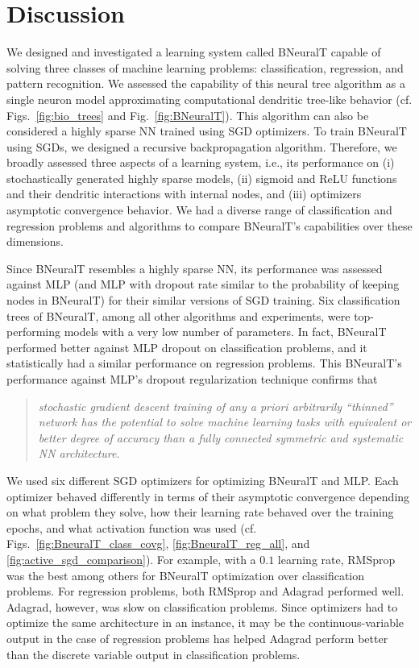 \documentclass[11pt,a4paper]{article}
\begin{document}
    
    \section{Discussion} 
    \label{sec:discussion}   
We designed and investigated a learning system called BNeuralT capable of solving three classes of machine learning problems: classification, regression, and pattern recognition. We assessed the capability of this neural tree algorithm as a single neuron model approximating computational dendritic tree-like behavior (cf. Figs.~\ref{fig:bio_trees} and Fig.~\ref{fig:BNeuralT}). This algorithm can also be considered a highly sparse NN trained using SGD optimizers. To train BNeuralT using SGDs, we designed a recursive backpropagation algorithm. Therefore, we broadly assessed three aspects of a learning system, i.e., its performance on (i) stochastically generated highly sparse models, (ii) sigmoid and ReLU functions and their dendritic interactions with internal nodes, and (iii) optimizers asymptotic convergence behavior. We had a diverse range of classification and regression problems and algorithms to compare BNeuralT's capabilities over these dimensions. 
    
    Since BNeuralT resembles a highly sparse NN, its performance was assessed against MLP (and MLP with dropout rate similar to the  probability of keeping nodes in BNeuralT) for their similar versions of SGD training. Six classification trees of BNeuralT, among all other algorithms and experiments, were top-performing models with a very low number of parameters. In fact, BNeuralT performed better against MLP dropout on classification problems, and it statistically had a similar performance on regression problems. This BNeuralT's performance against MLP's dropout regularization technique confirms that 
    \begin{quote}
    	    \textit{stochastic gradient descent training of any a priori arbitrarily ``thinned'' network has the potential to solve machine learning tasks with equivalent or better degree of accuracy than a fully connected symmetric and systematic NN architecture}. 
    \end{quote}

    
    We used six different SGD optimizers for optimizing BNeuralT and MLP. Each optimizer behaved differently in terms of their asymptotic convergence depending on what problem they solve, how their learning rate behaved over the training epochs, and what activation function was used  (cf. Figs.~\ref{fig:BneuralT_class_covg}, \ref{fig:BneuralT_reg_all}, and \ref{fig:active_sgd_comparison}). For example, with a $0.1$ learning rate, RMSprop was the best among others for BNeuralT optimization over classification problems. For regression problems, both RMSprop and Adagrad performed well. Adagrad, however, was slow on classification problems. Since optimizers had to optimize the same architecture in an instance, it may be the continuous-variable output in the case of regression problems has helped Adagrad perform better than the discrete variable output in classification problems.
    
\end{document}
